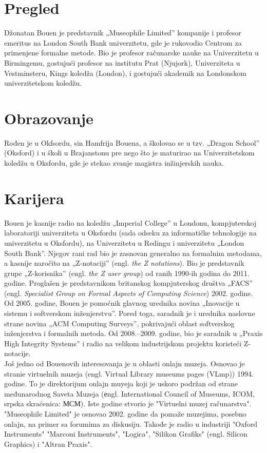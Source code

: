 \documentclass[a4paper]{article}
\begin{document}
\newpage
\section{Pregled}
\label{sec:pregled}
Džonatan Bouen je predstavnik „Museophile Limited” kompanije i profesor emeritus na London South Bank univerzitetu, gde je rukovodio Centrom za primenjene formalne metode\cite{btu}. Bio je profesor računarske nauke na Univerzitetu u Birmingemu\cite{ctn}, gostujući profesor na institutu Prat (Njujork), Univerziteta u Vestminsteru, Kings koledža (London)\cite{crest}, i gostujući akademik na Londonskom univerzitetskom koledžu\cite{homepage}.

\section{Obrazovanje}
Rođen je u Okfsordu, sin Hamfrija Bouena\cite{annss}, a školovao se u tzv. „Dragon School” (Oksford) i u školi u Brajanstonu pre nego što je maturirao na Univerzitetskom koledžu u Oksfordu, gde je stekao zvanje magistra inžinjerskih nauka. 
\section{Karijera}
Bouen je kasnije radio na koledžu „Imperial College” u Londonu, kompjuterskoj laboratoriji univerziteta u Oksfordu (sada odseku za informatičke tehnologije na univerzitetu u Oksfordu), na Univerzitetu u Redingu i univerzitetu „London South Bank”. Njegov rani rad bio je zasnovan generalno na formalnim metodama, a kasnije naročito na „Z-notaciji” (engl. \textit{the Z notations}). Bio je predstavnik grupe „Z-korisnika” (engl. \textit{the Z user group}) od ranih 1990-ih godina do 2011. godine. Proglašen je predstavnikom britanskog kompjuterskog društva „FACS” (engl. \textit{Specialist Group on Formal Aspects of Computing Science}) 2002. godine\cite{bcs}. Od 2005. godine, Bouen je pomoćnik glavnog urednika novina „Inovacije u sistemu i softverskom inženjerstvu”\cite{editorial}. Pored toga, saradnik je i urednika naslovne strane novina „ACM Computing Surveys”, pokrivajući oblast softverskog inženjerstva i formalnih metoda\cite{editorial2}. Od 2008.–2009. godine, bio je saradnik u „Praxis High Integrity Systems” i radio na velikom industrijskom projektu koristeći Z-notacije. \\
Još jedno od Bouenovih interesovanja je u oblasti onlajn muzeja. Osnovao je stranie virtuelnih muzeja (engl. Virtual Library museums pages (VLmp)) 1994. godine. To je direktorijum onlajn muyeja koji je uskoro podržan od strane međunarodnog Saveta Muzeja (еngl. International Council of Museums, ICOM, srpska skraćenica: МСМ).\cite{vlm} Iste godine stvorio je "Virtuelni muzej računarstva". 
"Museophile Limited"\cite{museophile} je osnovao 2002. godine da pomaže muzejima, posebno onlajn, na primer sa forumima za diskusiju.\cite{jonp} Takođe je radio u industriji "Oxford Instruments" "Marconi Instruments", "Logica", "Silikon Grafiks" (engl. Silicon Graphics) i "Altran Praxis". \\
\end{document}

